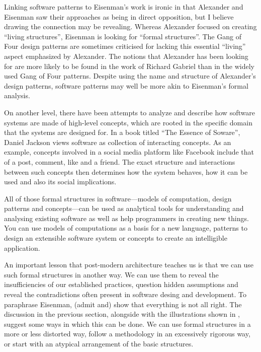 Linking software patterns to Eisenman's work is ironic in that Alexander and Eisenman saw
their approaches as being in direct opposition, but I believe drawing the connection
may be revealing. Whereas Alexander focused on creating ``living structures'', Eisenman is looking
for ``formal structures''. The Gang of Four design patterns are sometimes criticised for lacking
this essential ``living'' aspect emphasized by Alexander. The notions that Alexander has been
looking for are more likely to be found in the work of Richard Gabriel
than in the widely used Gang of Four patterns. Despite using the name and structure of Alexander's
design patterns, software patterns may well be more akin to Eisenman's formal analysis.

On another level, there have been attempts to analyze and describe how software systems are made of
high-level concepts, which are rooted in the specific domain that the systems are designed
for. In a book titled ``The Essence of Soware'', Daniel Jackson views software
as collection of interacting concepts. As an example, concepts involved in a social media
platform like Facebook include that of a post, comment, like and a friend. The exact structure
and interactions between such concepts then determines how the system behaves, how it can be
used and also its social implications.

All of those formal structures in software---models of computation, design patterns and
concepts---can be used as analytical tools for understanding and analysing existing software
as well as help programmers in creating new things. You can use models of computations as a
basis for a new language, patterns to design an extensible software system or concepts to
create an intelligible application.

An important lesson that post-modern architecture teaches us is that we can use such formal structures
in another way. We can use them to reveal the insufficiencies of our established practices, question
hidden assumptions and reveal the contradictions often present in software desing and development.
To paraphrase Eisenman, (admit and) show that everything is not all right. The
discussion in the previous section, alongside with the illustrations shown in ,
suggest some ways in which this can be done. We can use formal structures in a more or less distorted way,
follow a methodology in an excessively rigorous way, or start with an atypical arrangement
of the basic structures.

